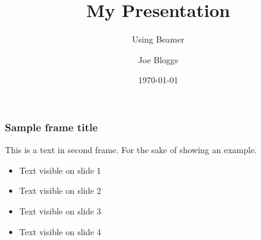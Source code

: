 \documentclass{beamer}
\title{My Presentation}
\subtitle{Using Beamer}
\author{Joe Bloggs}
\institute{University of ShareLaTeX}
\date{\today}
\begin{document}
\begin{frame}
    \titlepage
\end{frame}

\begin{frame}
    \frametitle{Sample frame title}
    This is a text in second frame. 
    For the sake of showing an example.
     
    \begin{itemize}
     \item<1-> Text visible on slide 1
     \item<2-> Text visible on slide 2
     \item<3> Text visible on slide 3
     \item<4-> Text visible on slide 4
    \end{itemize}
     
\end{frame}
\end{document}
